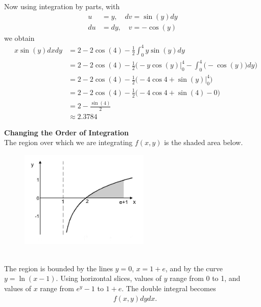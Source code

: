 Now using integration by parts, with 
\begin{align*}
  u &= y, \quad dv = \sin(y)dy \\
  du &= dy, \quad v = -\cos(y)
\end{align*}
we obtain
\begin{align*} 
  \mathop{\int_0^4 \!\!\! \int_{\sqrt{y}}^{2} } x\sin (y) dxdy
  &= 2  - 2\cos(4)  - \frac{1}{2} \int_0^4 y\sin(y) dy \\
  &= 2  - 2\cos(4)  - \frac{1}{2}\Bigg( -y\cos(y)\Big|_0^4 - \int_0^4 \big(-\cos(y)\big) dy \Bigg) \\
  &= 2  - 2\cos(4)  - \frac{1}{2}\Bigg( -4\cos4 + \sin(y)\big|_0^4 \Bigg)  \\  
  &= 2  - 2\cos(4)  - \frac{1}{2}\Big( -4\cos4 + \sin(4)- 0 \Big)  \\  
  &= 2 - \frac{\sin(4)}{2}   \\  
  &\approx 2.3784
\end{align*}
\EEN
\item %
\textbf{Changing the Order of Integration} \\
The region over which we are integrating $f(x,y)$ is the shaded area below. 
\begin{figure}[h]
  \vspace{-1pt}
  \begin{center}
    \includegraphics[width=0.55\textwidth]{ImgLog.jpg}
  \end{center}
\end{figure}\\
The region is bounded by the lines $y=0$, $x=1+e$, and by the curve $y=\ln(x-1)$. Using horizontal slices, values of $y$ range from 0 to 1, and values of $x$ range from $e^y-1$ to $1+e$. The double integral becomes
\begin{align*}
  \mathop{\int_{0}^{1} \! \int_{e^y-1}^{1+e}} f(x,y) dydx .
\end{align*}

